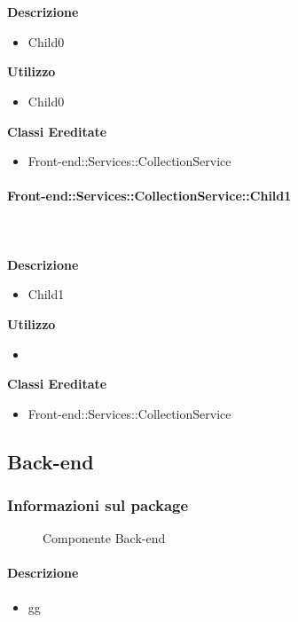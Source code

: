         \textbf{\\ \\ Descrizione} 
          \begin{itemize}
            \item[] Child0
          \end{itemize}      
        \textbf{Utilizzo}  
          \begin{itemize}
            \item[] Child0
          \end{itemize}
          \textbf{Classi Ereditate}
          \begin{itemize}
                \item{Front-end::Services::CollectionService}
          \end{itemize}
      \paragraph{Front-end::Services::CollectionService::Child1}
        
        \textbf{\\ \\ Descrizione} 
          \begin{itemize}
            \item[] Child1
          \end{itemize}      
        \textbf{Utilizzo}  
          \begin{itemize}
            \item[] 
          \end{itemize}
          \textbf{Classi Ereditate}
          \begin{itemize}
                \item{Front-end::Services::CollectionService}
          \end{itemize}
  \subsection{Back-end}
  \subsubsection{Informazioni sul package} 

    \begin{figure}[H] 
      \begin{center} 
        \caption{Componente Back-end}
      \end{center}  
    \end{figure} 

  \paragraph{Descrizione} 
    \begin{itemize}
    \item[] gg
    \end{itemize} 